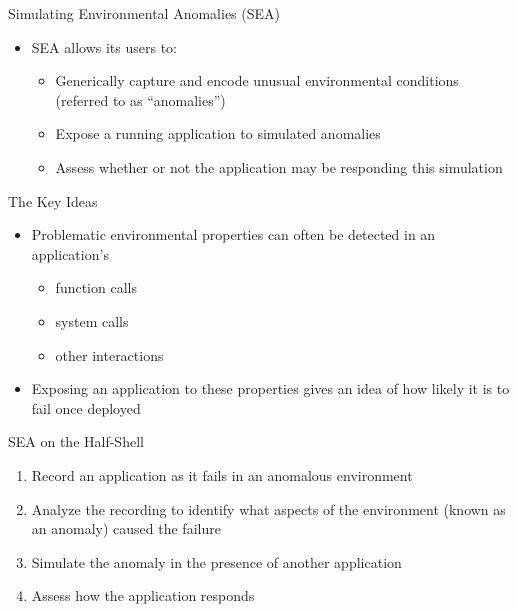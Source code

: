 \documentclass[pdf]{beamer}
\begin{document}
\begin{frame}{Simulating Environmental Anomalies (SEA)}
  \begin{itemize}
    \item{SEA allows its users to:}
      \begin{itemize}
        \item{Generically capture and encode unusual environmental
          conditions (referred to as ``anomalies'')}
        \item{Expose a running application to simulated anomalies}
        \item{Assess whether or not the application may be responding this
          simulation}
      \end{itemize}
  \end{itemize}
\end{frame}


\begin{frame}{The Key Ideas}
  \begin{itemize}
    \item{Problematic environmental properties can often be detected in an
      application's}
      \begin{itemize}
        \item{function calls}
        \item{system calls}
        \item{other interactions}
      \end{itemize}
    \item{Exposing an application to these properties gives an idea of how
      likely it is to fail once deployed}
  \end{itemize}
\end{frame}


\begin{frame}{SEA on the Half-Shell}
  \begin{enumerate}
    \item{Record an application as it fails in an anomalous environment}
    \item{Analyze the recording to identify what aspects of the environment
      (known as an anomaly) caused the failure}
    \item{Simulate the anomaly in the presence of another application}
    \item{Assess how the application responds}
  \end{enumerate}
\end{frame}
\end{document}
